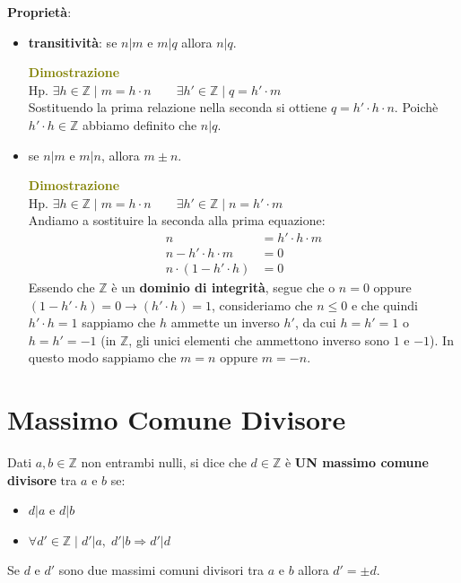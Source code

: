\textbf{Proprietà}:
\begin{itemize}[nosep]
    \item \textbf{transitività}: se $n|m$ e $m|q$ allora $n|q$.
    \begin{boxA}
        \textcolor{olive}{\textbf{Dimostrazione}} \\
        Hp. $\exists h \in \mathbb{Z} \; | \; m = h \cdot n \qquad \exists h' \in \mathbb{Z} \; | \; q = h' \cdot m$ \\
        Sostituendo la prima relazione nella seconda si ottiene $q = h' \cdot h \cdot n$. Poichè $h' \cdot h \in \mathbb{Z}$ abbiamo definito che $n|q$.
    \end{boxA}

    \item se $n|m$ e $m|n$, allora $m \pm n$.
    \begin{boxA}
        \textcolor{olive}{\textbf{Dimostrazione}} \\
        Hp. $\exists h \in \mathbb{Z} \; | \; m = h \cdot n \qquad \exists h' \in \mathbb{Z} \; | \; n = h' \cdot m$ \\
        Andiamo a sostituire la seconda alla prima equazione:
        \begin{align*}
            n &= h' \cdot h \cdot m \\
            n - h' \cdot h \cdot m &= 0 \\
            n \cdot (1 - h' \cdot h) &= 0
        \end{align*}
        Essendo che $\mathbb{Z}$ è un \textbf{dominio di integrità}, segue che o $n = 0$ oppure $(1 - h' \cdot h) = 0 \rightarrow (h' \cdot h) = 1$, consideriamo che $n \leq 0$ e che quindi $h' \cdot h = 1$ sappiamo che $h$ ammette un inverso $h'$, da cui $h = h' = 1$ o $h = h' = -1$ (in $\mathbb{Z}$, gli unici elementi che ammettono inverso sono $1$ e $-1$). In questo modo sappiamo che $m=n$ oppure $m=-n$.
    \end{boxA}
\end{itemize}

\section{Massimo Comune Divisore}
Dati $a,b \in \mathbb{Z}$ non entrambi nulli, si dice che $d \in \mathbb{Z}$ è \textbf{UN massimo comune divisore} tra $a$ e $b$ se:
\begin{itemize}[nosep]
    \item $d|a$ e $d|b$
    \item $\forall d' \in \mathbb{Z} \; | \; d'|a, \; d'|b \Rightarrow d'|d$
\end{itemize}
Se $d$ e $d'$ sono due massimi comuni divisori tra $a$ e $b$ allora $d' = \pm d$.